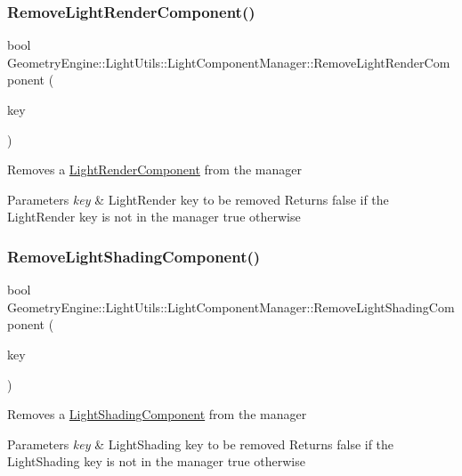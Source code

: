 \subsubsection{\texorpdfstring{RemoveLightRenderComponent()}{RemoveLightRenderComponent()}}
{\footnotesize\ttfamily bool Geometry\+Engine\+::\+Light\+Utils\+::\+Light\+Component\+Manager\+::\+Remove\+Light\+Render\+Component (\begin{DoxyParamCaption}\item[{\mbox{\hyperlink{namespace_geometry_engine_1_1_light_utils_ac3078de660742daceaa06bd9bc61d24a}{Light\+Render}}}]{key }\end{DoxyParamCaption})}

Removes a \mbox{\hyperlink{class_geometry_engine_1_1_light_utils_1_1_light_render_component}{Light\+Render\+Component}} from the manager 
\begin{DoxyParams}{Parameters}
{\em key} & Light\+Render key to be removed Returns false if the Light\+Render key is not in the manager true otherwise \\
\hline
\end{DoxyParams}
\mbox{\label{class_geometry_engine_1_1_light_utils_1_1_light_component_manager_a56c2e68fe7eb7188d1b489f7e3ef24a0}} 
\subsubsection{\texorpdfstring{RemoveLightShadingComponent()}{RemoveLightShadingComponent()}}
{\footnotesize\ttfamily bool Geometry\+Engine\+::\+Light\+Utils\+::\+Light\+Component\+Manager\+::\+Remove\+Light\+Shading\+Component (\begin{DoxyParamCaption}\item[{\mbox{\hyperlink{namespace_geometry_engine_1_1_light_utils_a16eb370137c2fd151e6f8e1d07cd23e0}{Light\+Shading}}}]{key }\end{DoxyParamCaption})}

Removes a \mbox{\hyperlink{class_geometry_engine_1_1_light_utils_1_1_light_shading_component}{Light\+Shading\+Component}} from the manager 
\begin{DoxyParams}{Parameters}
{\em key} & Light\+Shading key to be removed Returns false if the Light\+Shading key is not in the manager true otherwise \\
\hline
\end{DoxyParams}
\mbox{\label{class_geometry_engine_1_1_light_utils_1_1_light_component_manager_a58bdb7761c9adde821fda19062ef0ae5}} 
